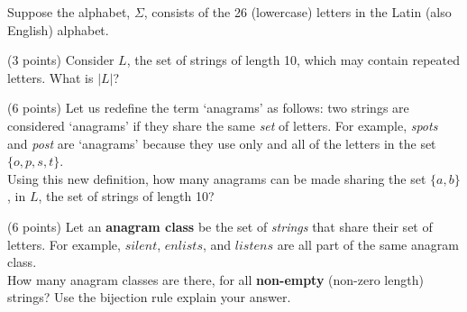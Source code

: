 \documentclass[11pt]{article}
\begin{document}
\begin{problem} 
    Suppose the alphabet, $\Sigma$, consists of the 26 (lowercase) letters in the Latin (also English) alphabet.

	\begin{ppart} (3 points)
		Consider $L$, the set of strings of length 10, which may contain repeated letters. What is $|L|$?

		
	\end{ppart}

	\begin{ppart} (6 points)
		Let us redefine the term `anagrams' as follows: two strings are considered `anagrams' if they share the same \emph{set} of letters. For example, \emph{spots} and \emph{post} are `anagrams'
		because they use only and all of the letters in the set $\{o, p, s, t\}$. \\

		Using this new definition, how many anagrams can be made sharing the set $\{a,b\}$, in $L$, the set of strings of length 10?

		
	\end{ppart}

	\begin{ppart} (6 points)
		Let an \textbf{anagram class} be the set of \emph{strings} that share their set of letters. For example, $silent$, $enlists$, and $listens$ are all part of the same anagram class. \\

		How many anagram classes are there, for all \textbf{non-empty} (non-zero length) strings? Use the bijection rule explain your answer.

		
	\end{ppart}
\end{problem}
\bigskip 
\end{document}
